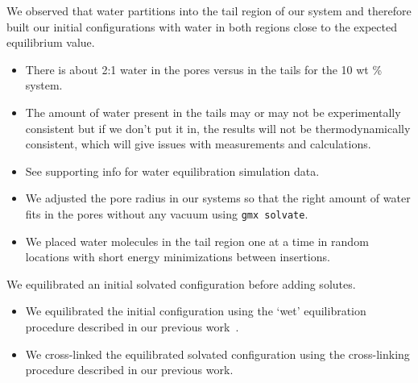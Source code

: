 \documentclass{article}
\begin{document}
  We observed that water partitions into the tail region of our system and therefore
  built our initial configurations with water in both regions close to the expected
  equilibrium value.
  \begin{itemize}
	\item There is about 2:1 water in the pores versus in the tails for the 10 wt \% system.
	\item The amount of water present in the tails may or may not be experimentally consistent
	but if we don't put it in, the results will not be thermodynamically consistent, which 
	will give issues with measurements and calculations.
	\item See supporting info for water equilibration simulation data.
	\item We adjusted the pore radius in our systems so that the right amount of water
	fits in the pores without any vacuum using \texttt{gmx solvate}.
	\item We placed water molecules in the tail region one at a time in random locations
	with short energy minimizations between insertions.
  \end{itemize}



  \noindent We equilibrated an initial solvated configuration before adding solutes.
  \begin{itemize}
	\item We equilibrated the initial configuration using the `wet'
	equilibration procedure described in our previous work~\cite{coscia_understanding_2019}.
	\item We cross-linked the equilibrated solvated configuration using the
	cross-linking procedure described in our previous work. 
  \end{itemize}
\end{document}
